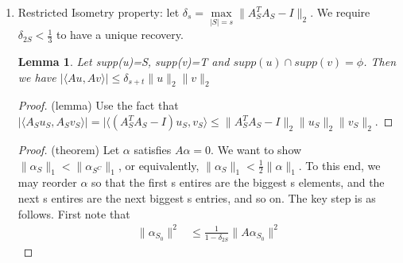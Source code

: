 \documentclass[11pt,reqno]{amsart}
\newtheorem{lemma}[theorem]{Lemma}
\theoremstyle{remark}
\begin{document}
\begin{sloppypar}
\begin{itemize}
\begin{enumerate}
\begin{proof}
Let $\alpha=\alpha_S+\alpha_{S^C}$ where $\alpha\in null(A)$. So $A(\alpha_S+\alpha_{S^C})=0$
, that is, $A\alpha_S=-A\alpha_{S^C}$.
By algebraic manipulation, we get
\[
\lVert \alpha_S\Vert_1\leq\dfrac{s\delta}{1-s\delta}\lVert\alpha_{S^C}\rVert_1
\] Since $\delta < \frac 1{2s}$, we have $\lVert\alpha_S\rVert_1<\lVert\alpha_{S^C}\rVert_1$. 
We showed that if $\alpha\in null(A)$, then $\lVert \alpha_S\rVert_1<\lVert\alpha_{S^C}\rVert_1$. So $A$ satisfies RNP.
\end{proof}
\begin{itemize}
\item Asking for something more than $S$ might be too much, so we restrict it to $S$.
\item This $A^T A$ situation in general comes up in regression 
problem; in $A^T Ax=A^T y$ we want $A^T A$ to be close to identity in order to recover $x$.
\item By JL lemma, we have $\lVert\dfrac{G^T G}{N}-I\rVert_{\infty}\leq\sqrt{\dfrac{\log p}N}=\epsilon$.
\item This is because in JL lemma, we have $N-O(\dfrac{\log p}{\epsilon^2})$. This achieves $N\sim s^2$, but in general, we want $N\sim s$.
\end{itemize}
\item Restricted Isometry property: let $\delta_s=\max\limits_{\lvert S\rvert=s}\lVert 
A^T_S A_S-I\rVert_2$. We require $\delta_{2S}< \frac 13$ to have a unique recovery.
\begin{lemma}
Let supp(u)=S, supp(v)=T and $supp(u)\cap supp(v)=\phi$. 
Then we have $\lvert\langle Au, Av\rangle\rvert\leq\delta_{s+t}\lVert u\rVert_2\rVert 
v\rVert_2$
\end{lemma}
\begin{proof} (lemma)
Use the fact that $\lvert \langle A_S u_S, A_S 
v_S\rangle\rvert=\lvert\langle(A_S^T A_S-I)u_S, v_S\rangle\leq 
\lVert A_S^T A_S-I\rVert_2\lVert u_S\rVert_2\lVert v_S\rVert_2$.
\end{proof}
\begin{proof} (theorem)
Let $\alpha$ satisfies $A\alpha=0$. We want to show $\lVert \alpha_S\rVert_1<\lVert 
\alpha_{S^C}\rVert_1$, or equivalently, $\lVert \alpha_S\rVert_1<\frac 12\lVert 
\alpha\rVert_1$. To this end, we may reorder $\alpha$ so that the first s entires are the biggest s elements, and the next s entires are the next
 biggest s entries, and so on.
The key step is as follows. First note that  
\begin{align*}
\lVert\alpha_{S_0}\rVert^2 &\leq \frac 1{1-\delta_{2S}}\lVert A\alpha_{S_0}\rVert^2

\end{align*}
\end{proof}
\end{enumerate}
\end{itemize}
\end{sloppypar}
\end{document}
